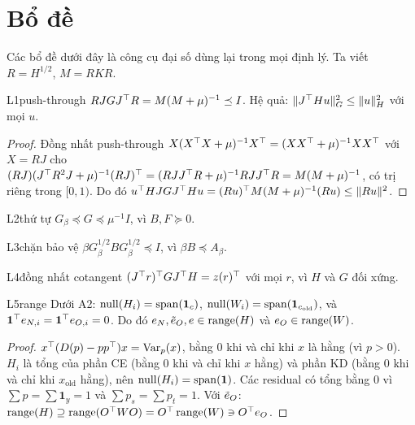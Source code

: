 \section{Bổ đề}\label{sec:lemmas}

Các bổ đề dưới đây là công cụ đại số dùng lại trong mọi định lý. Ta viết $R=H^{1/2}$, $M=RKR$.

\begin{namedthm}{L1}{push-through}
$RJGJ^{\top} R=M(M+\mu)^{-1}\preceq I$. Hệ quả: $\lVert J^{\top} Hu\rVert_G^2\le\lVert u\rVert_H^2$ với mọi $u$.
\end{namedthm}
\begin{proof}
Đồng nhất push-through $X(X^{\top} X+\mu)^{-1}X^{\top}=(XX^{\top}+\mu)^{-1}XX^{\top}$ với $X=RJ$ cho $(RJ)(J^{\top} R^2J+\mu)^{-1}(RJ)^{\top}=(RJJ^{\top} R+\mu)^{-1}RJJ^{\top} R=M(M+\mu)^{-1}$, có trị riêng trong $[0,1)$. Do đó $u^{\top} HJGJ^{\top} Hu=(Ru)^{\top} M(M+\mu)^{-1}(Ru)\le\lVert Ru\rVert^2$.
\end{proof}

\begin{namedthm}{L2}{thứ tự}
$G_\beta\preceq G\preceq\mu^{-1}I$, vì $B,F\succeq0$.
\end{namedthm}

\begin{namedthm}{L3}{chặn bảo vệ}
$\beta G_\beta^{1/2}BG_\beta^{1/2}\preceq I$, vì $\beta B\preceq A_\beta$.
\end{namedthm}

\begin{namedthm}{L4}{đồng nhất cotangent}
$(J^{\top} r)^{\top} GJ^{\top} H=z(r)^{\top}$ với mọi $r$, vì $H$ và $G$ đối xứng.
\end{namedthm}

\begin{namedthm}{L5}{range}
Dưới A2: $\operatorname{null}(H_i)=\operatorname{span}(\mathbf 1_c)$, $\operatorname{null}(W_i)=\operatorname{span}(\mathbf 1_{c_{\mathrm{old}}})$, và $\mathbf 1^{\top} e_{N,i}=\mathbf 1^{\top} e_{O,i}=0$. Do đó $e_N,\tilde e_O,e\in\operatorname{range}(H)$ và $e_O\in\operatorname{range}(W)$.
\end{namedthm}
\begin{proof}
$x^{\top}(D(p)-pp^{\top})x=\operatorname{Var}_p(x)$, bằng $0$ khi và chỉ khi $x$ là hằng (vì $p>0$). $H_i$ là tổng của phần CE (bằng $0$ khi và chỉ khi $x$ hằng) và phần KD (bằng $0$ khi và chỉ khi $x_{\mathrm{old}}$ hằng), nên $\operatorname{null}(H_i)=\operatorname{span}(\mathbf 1)$. Các residual có tổng bằng $0$ vì $\sum p=\sum\mathbf 1_y=1$ và $\sum p_s=\sum p_t=1$. Với $\tilde e_O$: $\operatorname{range}(H)\supseteq\operatorname{range}(O^{\top} WO)=O^{\top}\operatorname{range}(W)\ni O^{\top} e_O$.
\end{proof}


